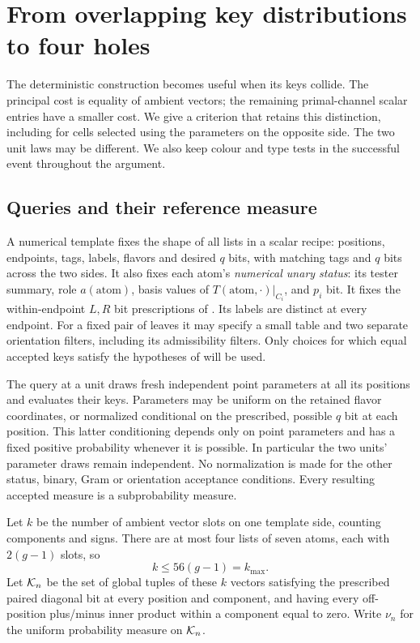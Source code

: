 \section{From overlapping key distributions to four holes}\label{sec:collision}

The deterministic construction becomes useful when its keys collide.
The principal cost is equality of ambient vectors; the remaining
primal-channel scalar entries have a smaller cost.  We give a
criterion that retains this distinction, including for cells selected
using the parameters on the opposite side.  The two unit laws may
be different.  We also keep colour and type tests in the successful
event throughout the argument.

\subsection{Queries and their reference measure}

A numerical template fixes the shape of all lists in a scalar
recipe: positions, endpoints, tags, labels, flavors and desired
$q$ bits, with matching tags and $q$ bits across the two sides.
It also fixes each atom's \emph{numerical unary status}: its tester
summary, role $a(\mathrm{atom})$, basis values of
$T(\mathrm{atom},\cdot)|_{C_i}$, and $p_i$ bit.
It fixes the within-endpoint $L,R$ bit prescriptions of
. Its labels are distinct at every endpoint.
For a fixed pair of leaves it may specify a small table and two
separate orientation filters, including its admissibility filters.
Only choices for which equal accepted keys satisfy the hypotheses
of  will be used.

The query at a unit draws fresh independent point parameters at
all its positions and evaluates their keys.  Parameters may be
uniform on the retained flavor coordinates, or normalized
conditional on the prescribed, possible $q$ bit at each position.
This latter conditioning depends only on point parameters and
has a fixed positive probability whenever it is possible.  In
particular the two units' parameter draws remain independent.
No normalization is made for the other status, binary, Gram or
orientation acceptance conditions.  Every resulting accepted
measure is a subprobability measure.

Let $k$ be the number of ambient vector slots on one template
side, counting components and signs.  There are at most four
lists of seven atoms, each with $2(g-1)$ slots, so
\begin{equation}\label{eq:key-rank-budget}
 k\le 56(g-1)=k_{\max}.
\end{equation}
Let $\mathcal K_n$ be the set of global tuples of these $k$ vectors
satisfying the prescribed paired diagonal bit at every position
and component, and having every off-position plus/minus inner
product within a component equal to zero.  Write $\nu_n$ for
the uniform probability measure on $\mathcal K_n$.

